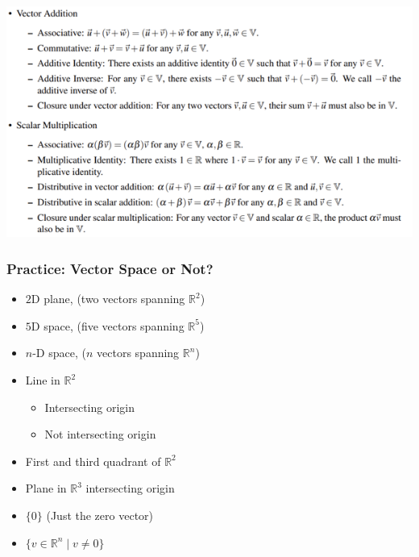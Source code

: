 \documentclass{beamer}
\begin{document}
\begin{frame}
\includegraphics[width=\textwidth]{./images/vector_space_properties.png}
\end{frame}

\begin{frame}
    \frametitle{Practice: Vector Space or Not?}
    \begin{itemize}
        \item $2$D plane, (two vectors spanning $\mathbb{R}^2$) 
        \item $5$D space, (five vectors spanning $\mathbb{R}^5$) 
        \item $n$-D space, ($n$ vectors spanning $\mathbb{R}^n$) 
        \item Line in $\mathbb{R}^2$ 
        \begin{itemize}
            \item Intersecting origin 
            \item Not intersecting origin 
        \end{itemize}
    \item First and third quadrant of $\mathbb{R}^2$ 
    \item Plane in $\mathbb{R}^3$ intersecting origin 
    \item $\{ 0 \}$ (Just the zero vector) 
    \item $\{ v \in \mathbb{R}^n \mid v \neq 0 \}$ 
    \end{itemize}
\end{frame}
\end{document}
